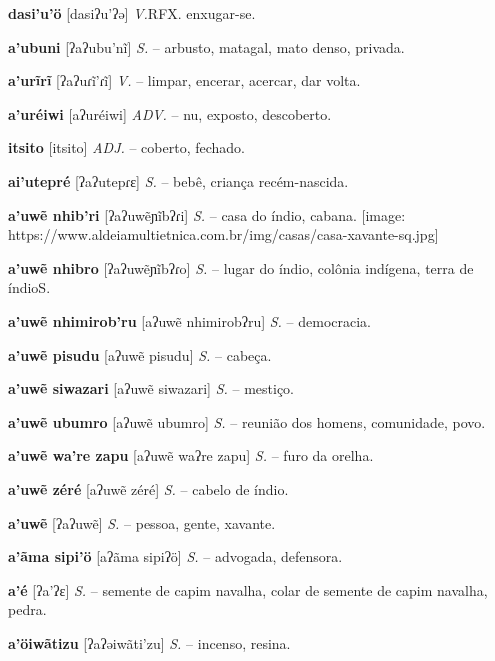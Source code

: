 \textbf{dasi'u'ö} [dasiʔu'ʔə] \textit{V.}RFX. enxugar-se.

\textbf{a'ubuni} [ʔaʔubu'nĩ] \textit{S.} -- arbusto, matagal, mato denso, privada.

\textbf{a'urĩrĩ} [ʔaʔuɾĩ'ɾĩ] \textit{V.} -- limpar, encerar, acercar, dar volta.

\textbf{a'uréiwi} [aʔuréiwi] \textit{ADV.} -- nu, exposto, descoberto.

\textbf{itsito} [itsito] \textit{ADJ.} -- coberto, fechado.

\textbf{ai'utepré} [ʔaʔutepɾɛ] \textit{S.} -- bebê, criança recém-nascida.

\textbf{a'uwẽ nhib'ri} [ʔaʔuwẽɲĩbʔɾi] \textit{S.} -- casa do índio, cabana. [image: https://www.aldeiamultietnica.com.br/img/casas/casa-xavante-sq.jpg]

\textbf{a'uwẽ nhibro} [ʔaʔuwẽɲĩbʔɾo] \textit{S.} -- lugar do índio, colônia indígena, terra de índioS.

\textbf{a'uwẽ nhimirob'ru} [aʔuwẽ nhimirobʔru] \textit{S.} -- democracia.

\textbf{a'uwẽ pisudu} [aʔuwẽ pisudu] \textit{S.} -- cabeça.

\textbf{a'uwẽ siwazari} [aʔuwẽ siwazari] \textit{S.} -- mestiço.

\textbf{a'uwẽ ubumro} [aʔuwẽ ubumro] \textit{S.} -- reunião dos homens, comunidade, povo.

\textbf{a'uwẽ wa're zapu} [aʔuwẽ waʔre zapu] \textit{S.} -- furo da orelha.

\textbf{a'uwẽ zéré} [aʔuwẽ zéré] \textit{S.} -- cabelo de índio.

\textbf{a'uwẽ} [ʔaʔuwẽ] \textit{S.} -- pessoa, gente, xavante.

\textbf{a'ãma sipi'ö} [aʔãma sipiʔö] \textit{S.} -- advogada, defensora.

\textbf{a'é} [ʔa'ʔɛ] \textit{S.} -- semente de capim navalha, colar de semente de capim navalha, pedra.

\textbf{a'öiwãtizu} [ʔaʔəiwãti'zu] \textit{S.} -- incenso, resina.

